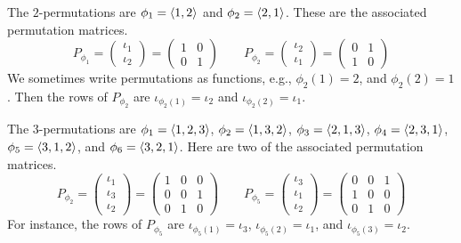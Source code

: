\begin{example} \label{ex:AllTwoThreePerms}
The $2$-permutations are
\( \phi_1=\langle1,2\rangle \) and \( \phi_2=\langle2,1\rangle \).
These are the associated permutation matrices.
\begin{equation*}
  P_{\phi_1}
  =\begin{pmatrix}
      \iota_1 \\
      \iota_2 
   \end{pmatrix}
  =\begin{pmatrix}
    1  &0         \\
    0  &1   
  \end{pmatrix}
  \qquad
  P_{\phi_2}
   =\begin{pmatrix}
      \iota_2 \\
      \iota_1 
   \end{pmatrix}
   =\begin{pmatrix}
    0  &1         \\
    1  &0   
  \end{pmatrix}
\end{equation*}
We sometimes write permutations as functions, e.g., \( \phi_2(1)=2 \),
and \( \phi_2(2)=1 \).
Then the rows of $P_{\phi_2}$ are 
$\iota_{\phi_2(1)}=\iota_2$ and $\iota_{\phi_2(2)}=\iota_1$.

The $3$-permutations are
\( \phi_1=\langle1,2,3\rangle \),
\( \phi_2=\langle1,3,2\rangle \),
\( \phi_3=\langle2,1,3\rangle \),
\( \phi_4=\langle2,3,1\rangle \),
\( \phi_5=\langle3,1,2\rangle \), and
\( \phi_6=\langle3,2,1\rangle \).
Here are two of the associated permutation matrices.
\begin{equation*}
  P_{\phi_2}
   =\begin{pmatrix}
      \iota_1 \\
      \iota_3 \\
      \iota_2 
   \end{pmatrix}
  =\begin{pmatrix}
     1      &0        &0        \\
     0      &0        &1        \\
     0      &1        &0
  \end{pmatrix}
  \qquad
  P_{\phi_5}
   =\begin{pmatrix}
      \iota_3 \\
      \iota_1 \\
      \iota_2 
   \end{pmatrix}
  =\begin{pmatrix}
     0      &0        &1        \\
     1      &0        &0        \\
     0      &1        &0
  \end{pmatrix}
\end{equation*}
For instance, the rows of $P_{\phi_5}$ are $\iota_{\phi_5(1)}=\iota_3$, 
$\iota_{\phi_5(2)}=\iota_1$, and $\iota_{\phi_5(3)}=\iota_2$.
\end{example}

